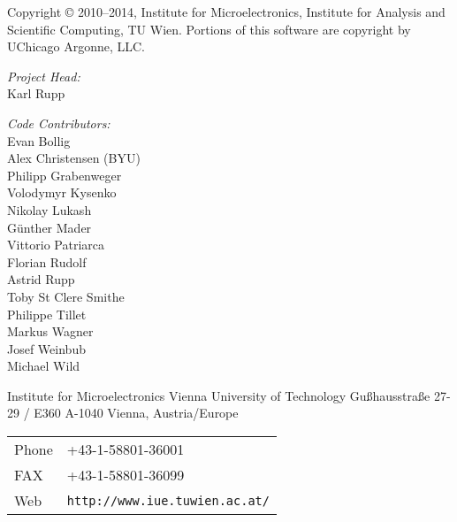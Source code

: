 
\clearpage

Copyright {\copyright} 2010--2014, Institute for Microelectronics,
                            Institute for Analysis and Scientific Computing,
                            TU Wien.
Portions of this software are copyright by UChicago Argonne, LLC.

\vspace{2.cm}

\textit{Project Head:}\\

Karl Rupp\\

\vspace{2.cm}

\textit{Code Contributors:} \\

Evan Bollig \\
Alex Christensen (BYU) \\
Philipp Grabenweger \\
Volodymyr Kysenko \\
Nikolay Lukash \\
G\"unther Mader \\
Vittorio Patriarca \\
Florian Rudolf \\
Astrid Rupp \\
Toby St Clere Smithe \\
Philippe Tillet \\
Markus Wagner \\
Josef Weinbub \\
Michael Wild \\



\vspace{3.5cm}

Institute for Microelectronics\newline
Vienna University of Technology\newline
Gu\ss hausstra\ss e 27-29 / E360\newline
A-1040 Vienna, Austria/Europe\newline


\begin{tabular}{ll}
Phone  & +43-1-58801-36001\\
FAX    & +43-1-58801-36099\\
Web    & \texttt{http://www.iue.tuwien.ac.at/}
\end{tabular}




